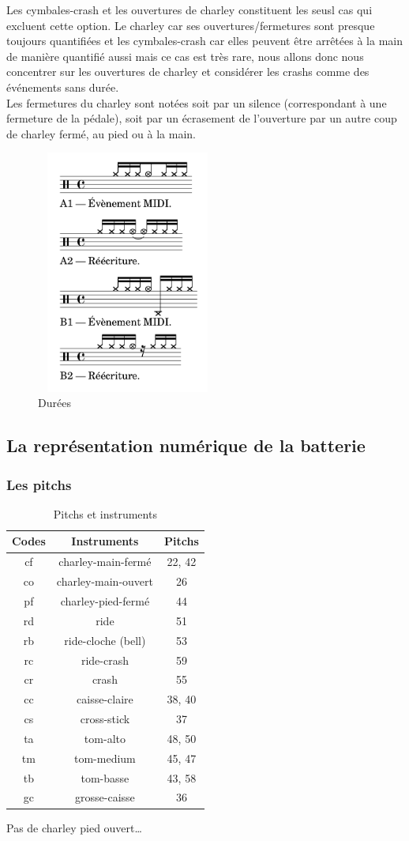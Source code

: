 Les cymbales-crash et les ouvertures de charley constituent les seusl cas qui excluent cette option. Le charley car ses ouvertures/fermetures sont presque toujours quantifiées et les cymbales-crash car elles peuvent être arrêtées à la main de manière quantifié aussi mais ce cas est très rare, nous allons donc nous concentrer sur les ouvertures de charley et considérer les crashs comme des événements sans durée.\\
Les fermetures du charley sont notées soit par un silence (correspondant à une fermeture de la pédale), soit par un écrasement de l’ouverture par un autre coup de charley fermé, au pied ou à la main.
\begin{figure}[h]
	\includegraphics[height=80mm, width=60mm]{z_images/reecriture/exemples_charley_1.png}
	\caption{Durées}
\end{figure} 
\subsection*{La représentation numérique de la batterie}
\subsubsection{Les pitchs}
\begin{table}[h]
	\centering
	\begin{tabular}{|c|c|c|} \hline
		Codes & Instruments & Pitchs \\ \hline
		cf & charley-main-fermé & 22, 42 \\
		co & charley-main-ouvert & 26 \\
		pf & charley-pied-fermé & 44 \\
		rd & ride & 51 \\
		rb & ride-cloche (bell) & 53 \\
		rc & ride-crash & 59 \\
		cr & crash & 55 \\
		cc & caisse-claire & 38, 40 \\
		cs & cross-stick & 37 \\
		ta & tom-alto & 48, 50 \\
		tm & tom-medium & 45, 47 \\
		tb & tom-basse & 43, 58 \\
		gc & grosse-caisse & 36 \\ \hline
	\end{tabular}
	\caption{Pitchs et instruments}
\end{table}
Pas de charley pied ouvert…
